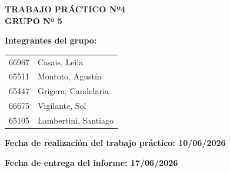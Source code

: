 \begin{center}
    
    {\large \textbf{TRABAJO PRÁCTICO Nº4}}\\[0.5cm]
    
    {\normalsize \textbf{GRUPO Nº 5}}\\[0.5cm]

\end{center}

\vspace{0.5cm}

\textbf{Integrantes del grupo:}

\vspace{0.3cm}

\begin{tabular}{p{5cm} p{8cm}}
66967 & Casais, Leila \\
65511 & Montoto, Agustín \\
65447 & Grigera, Candelaria\\
66675 & Vigilante, Sol \\
65105 & Lambertini, Santiago \\
\end{tabular}

\vspace{0.8cm}

\textbf{Fecha de realización del trabajo práctico: 10/06/2026} \\
\vspace{0.3cm}

\textbf{Fecha de entrega del informe: 17/06/2026}

\vspace{1cm}

\newpage
